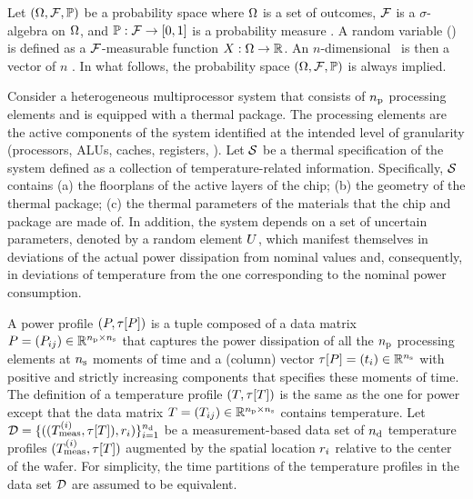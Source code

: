 Let $(\Omega, \mathcal{F}, \mathbb{P})$ be a probability space where $\Omega$ is a set of outcomes, $\mathcal{F}$ is a $\sigma$-algebra on $\Omega$, and $\mathbb{P}: \mathcal{F} \to [0, 1]$ is a probability measure \cite{durrett2010}. A random variable (\rv) is defined as a $\mathcal{F}$-measurable function $X: \Omega \to \mathbb{R}$. An $n$-dimensional \rv\ is then a vector of $n$ \rvs. In what follows, the probability space $(\Omega, \mathcal{F}, \mathbb{P})$ is always implied.

Consider a heterogeneous multiprocessor system that consists of ${n_\text{p}}$ processing elements and is equipped with a thermal package. The processing elements are the active components of the system identified at the intended level of granularity (processors, ALUs, caches, registers, \etc). Let $\mathcal{S}$ be a thermal specification of the system defined as a collection of temperature-related information. Specifically, $\mathcal{S}$ contains (a) the floorplans of the active layers of the chip; (b) the geometry of the thermal package; (c) the thermal parameters of the materials that the chip and package are made of. In addition, the system depends on a set of uncertain parameters, denoted by a random element $U$, which manifest themselves in deviations of the actual power dissipation from nominal values and, consequently, in deviations of temperature from the one corresponding to the nominal power consumption.

A power profile $\profileP$ is a tuple composed of a data matrix $P = (P_{ij}) \in \mathbb{R}^{{n_\text{p}} \times {n_\text{s}}}$ that captures the power dissipation of all the ${n_\text{p}}$ processing elements at ${n_\text{s}}$ moments of time and a (column) vector $\tau[P] = (t_i) \in \mathbb{R}^{{n_\text{s}}}$ with positive and strictly increasing components that specifies these moments of time. The definition of a temperature profile $\profileT$ is the same as the one for power except that the data matrix $T = (T_{ij}) \in \mathbb{R}^{{n_\text{p}} \times {n_\text{s}}}$ contains temperature. Let $\mathcal{D} = \{ ((T^{(i)}_{\text{meas}}, \tau[T]), r_i) \}_{i = 1}^{{n_\text{d}}}$ be a measurement-based data set of ${n_\text{d}}$ temperature profiles $(T^{(i)}_{\text{meas}}, \tau[T])$ augmented by the spatial location $r_i$ relative to the center of the wafer. For simplicity, the time partitions of the temperature profiles in the data set $\mathcal{D}$ are assumed to be equivalent.

